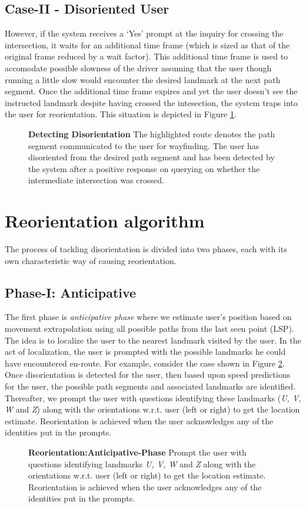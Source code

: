 \documentclass{iitkthesis}
\begin{document}
\subsection*{Case-II - Disoriented User}
However, if the system receives a `Yes' prompt at the inquiry for crossing the intersection, it waits for an additional time frame (which is sized as that of the original frame reduced by a wait factor). This additional time frame is used to accomodate possible slowness of the driver assuming that the user though running a little slow would encounter the desired landmark at the next path segment. Once the additional time frame expires and yet the user doesn't see the instructed landmark despite having crossed the intesection, the system traps into the user for reorientation. This situation is depicted in Figure \ref{fig:detect}. 
\begin{figure}
\centering
{}
\caption{\textbf{Detecting Disorientation} The highlighted route denotes the path segment communicated to the user for wayfinding. The user has disoriented from the desired path segment and has been detected by the system after a positive response on querying on whether the intermediate intersection was crossed.}
\label{fig:detect}
 \end{figure}
\section{Reorientation algorithm}
\label{sec:reorient}
The process of tackling disorientation is divided into two phases, each with its own characteristic way of causing reorientation. 
\subsection*{Phase-I: Anticipative}
The first phase is \textit{anticipative phase} where we estimate user's position based on movement extrapolation using all possible paths from the last seen point (LSP). The idea is to localize the user to the nearest landmark visited by the user. In the act of localization, the user is prompted with the possible landmarks he could have encountered en-route. For example, consider the case shown in Figure \ref{fig:anticipative}. Once disorientation is detected for the user, then based upon speed predictions for the user, the possible path segments and associated landmarks are identified. Thereafter, we prompt the user with questions identifying these landmarks (\textit{U, V, W} and \textit{Z}) along with the orientations w.r.t. user (left or right) to get the location estimate. Reorientation is achieved when the user acknowledges any of the identities put in the prompts.
\begin{figure}
\centering
{}
\caption{\textbf{Reorientation:Anticipative-Phase} Prompt the user with questions identifying landmarks \textit{U, V, W} and \textit{Z} along with the orientations w.r.t. user (left or right) to get the location estimate. Reorientation is achieved when the user acknowledges any of the identities put in the prompts.}
\label{fig:anticipative}
 \end{figure}
\end{document}
